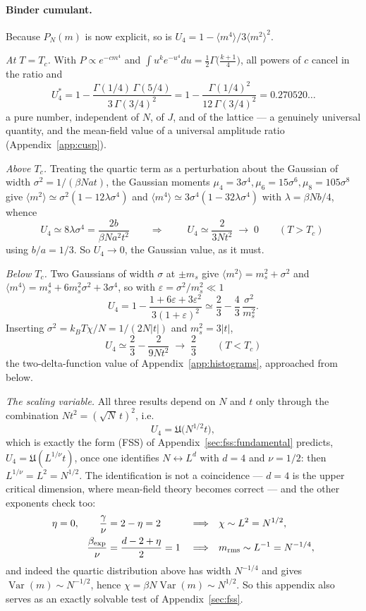 \documentclass[10pt,a4paper]{article}
\theoremstyle{remark}
\newcommand{\Var}{\operatorname{Var}}
\begin{document}
\paragraph{Binder cumulant.} Because $P_N(m)$ is now explicit, so is
$U_4=1-\langle m^{4}\rangle/3\langle m^{2}\rangle^{2}$.

\emph{At $T=T_c$.} With $P\propto e^{-cm^{4}}$ and
$\int u^{k}e^{-u^{4}}du=\tfrac12\Gamma\big(\tfrac{k+1}{4}\big)$, all powers of
$c$ cancel in the ratio and
\[
\;
U_4^{\ast}=1-\frac{\Gamma(1/4)\,\Gamma(5/4)}{3\,\Gamma(3/4)^{2}}
=1-\frac{\Gamma(1/4)^{2}}{12\,\Gamma(3/4)^{2}}
=0.270520\ldots\
\]
a pure number, independent of $N$, of $J$, and of the lattice --- a genuinely
universal quantity, and the mean-field value of a universal amplitude ratio
(Appendix~\ref{app:cusp}).

\emph{Above $T_c$.} Treating the quartic term as a perturbation about the Gaussian
of width $\sigma^{2}=1/(\beta N a t)$, the Gaussian moments
$\mu_4=3\sigma^{4},\mu_6=15\sigma^{6},\mu_8=105\sigma^{8}$ give
$\langle m^{2}\rangle\simeq\sigma^{2}(1-12\lambda\sigma^{4})$ and
$\langle m^{4}\rangle\simeq3\sigma^{4}(1-32\lambda\sigma^{4})$ with
$\lambda=\beta Nb/4$, whence
\[
U_4\simeq8\lambda\sigma^{4}=\frac{2b}{\beta N a^{2}t^{2}}
\qquad\Longrightarrow\qquad
\;U_4\simeq\frac{2}{3N t^{2}}\;\longrightarrow\;0
\qquad(T>T_c)\
\]
using $b/a=1/3$. So $U_4\to0$, the Gaussian value, as it must.

\emph{Below $T_c$.} Two Gaussians of width $\sigma$ at $\pm m_s$ give
$\langle m^{2}\rangle=m_s^{2}+\sigma^{2}$ and
$\langle m^{4}\rangle=m_s^{4}+6m_s^{2}\sigma^{2}+3\sigma^{4}$, so with
$\varepsilon=\sigma^{2}/m_s^{2}\ll1$
\[
U_4=1-\frac{1+6\varepsilon+3\varepsilon^{2}}{3(1+\varepsilon)^{2}}
\simeq\frac{2}{3}-\frac{4}{3}\,\frac{\sigma^{2}}{m_s^{2}} .
\]
Inserting $\sigma^{2}=k_BT\chi/N=1/(2N|t|)$ and $m_s^{2}=3|t|$,
\[
\;U_4\simeq\frac{2}{3}-\frac{2}{9N t^{2}}\;\longrightarrow\;\frac{2}{3}
\qquad(T<T_c)\
\]
the two-delta-function value of Appendix~\ref{app:histograms}, approached from
below.

\emph{The scaling variable.} All three results depend on $N$ and $t$ only through
the combination $Nt^{2}=(\sqrt{N}\,t)^{2}$, i.e.
\[
U_4=\mathfrak{U}\big(N^{1/2}t\big),
\]
which is exactly the form (FSS) of Appendix~\ref{sec:fss:fundamental} predicts,
$U_4=\mathfrak{U}(L^{1/\nu}t)$, once one identifies $N\leftrightarrow L^{d}$ with
$d=4$ and $\nu=1/2$: then $L^{1/\nu}=L^{2}=N^{1/2}$. The identification is not a
coincidence --- $d=4$ is the upper critical dimension, where mean-field theory
becomes correct --- and the other exponents check too:
\begin{align*}
\eta=0,\qquad
\frac{\gamma}{\nu}&=2-\eta=2
&&\Longrightarrow&& \chi\sim L^{2}=N^{1/2},\\
\frac{\beta_{\rm exp}}{\nu}&=\frac{d-2+\eta}{2}=1
&&\Longrightarrow&& m_{\rm rms}\sim L^{-1}=N^{-1/4} ,
\end{align*}
and indeed the quartic distribution above has width $N^{-1/4}$ and gives
$\Var(m)\sim N^{-1/2}$, hence $\chi=\beta N\Var(m)\sim N^{1/2}$. So this appendix
also serves as an exactly solvable test of Appendix~\ref{sec:fss}.
\end{document}
